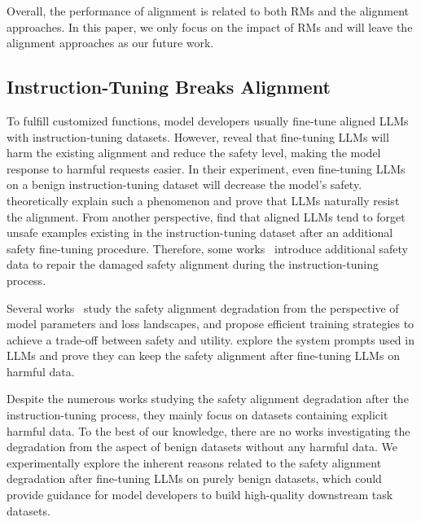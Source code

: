 Overall, the performance of alignment is related to both RMs and the alignment approaches. In this paper, we only focus on the impact of RMs and will leave the alignment approaches as our future work.

\subsection{Instruction-Tuning Breaks Alignment}

To fulfill customized functions, model developers usually fine-tune aligned LLMs with instruction-tuning datasets. However, \citet{qi_fine-tuning_2024} reveal that fine-tuning LLMs will harm the existing alignment and reduce the safety level, making the model response to harmful requests easier. In their experiment, even fine-tuning LLMs on a benign instruction-tuning dataset will decrease the model's safety. \citet{ji_language_2024} theoretically explain such a phenomenon and prove that LLMs naturally resist the alignment. From another perspective, \citet{zhao_learning_2024} find that aligned LLMs tend to forget unsafe examples existing in the instruction-tuning dataset after an additional safety fine-tuning procedure. Therefore, some works~\cite{huang_lazy_2024,qi_safety_2024} introduce additional safety data to repair the damaged safety alignment during the instruction-tuning process.

Several works~\cite{hsu_safe_2024,peng_navigating_2024,jain_what_2024} study the safety alignment degradation from the perspective of model parameters and loss landscapes, and propose efficient training strategies to achieve a trade-off between safety and utility. \citet{lyu_keeping_2024} explore the system prompts used in LLMs and prove they can keep the safety alignment after fine-tuning LLMs on harmful data.

Despite the numerous works studying the safety alignment degradation after the instruction-tuning process, they mainly focus on datasets containing explicit harmful data. To the best of our knowledge, there are no works investigating the degradation from the aspect of benign datasets without any harmful data. We experimentally explore the inherent reasons related to the safety alignment degradation after fine-tuning LLMs on purely benign datasets, which could provide guidance for model developers to build high-quality downstream task datasets.